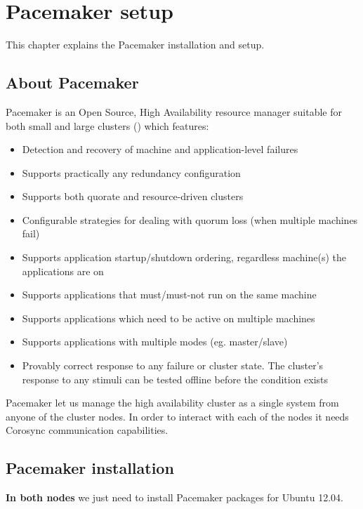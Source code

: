 
\chapter {Pacemaker setup}
\label{chap:pacemaker-setup}

This chapter explains the Pacemaker installation and setup.

\section {\label{sec:about-pacemaker}About Pacemaker}

Pacemaker is an Open Source, High Availability resource manager suitable for both small and large clusters (\cite{PacemakerWebpage}) which features:
\begin{itemize}
  \item Detection and recovery of machine and application-level failures
  \item Supports practically any redundancy configuration
  \item Supports both quorate and resource-driven clusters
  \item Configurable strategies for dealing with quorum loss (when multiple machines fail)
  \item Supports application startup/shutdown ordering, regardless machine(s) the applications are on
  \item Supports applications that must/must-not run on the same machine
  \item Supports applications which need to be active on multiple machines
  \item Supports applications with multiple modes (eg. master/slave)
  \item Provably correct response to any failure or cluster state. The cluster's response to any stimuli can be tested offline before the condition exists
\end{itemize}

Pacemaker let us manage the high availability cluster as a single system from anyone of the cluster nodes. In order to interact with each of the nodes it needs Corosync communication capabilities.


\section {Pacemaker installation}
\textbf{In both nodes} we just need to install Pacemaker packages for Ubuntu 12.04.

